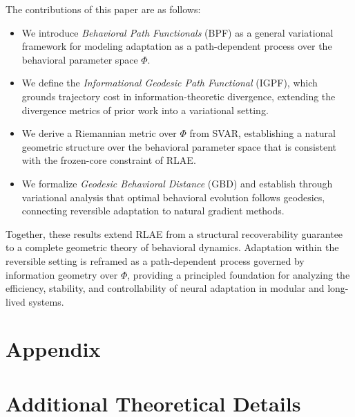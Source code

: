 \documentclass{article}
\begin{document}
The contributions of this paper are as follows:

\begin{itemize}
    \item We introduce \textit{Behavioral Path Functionals} (BPF) as a general variational
    framework for modeling adaptation as a path-dependent process over the behavioral
    parameter space $\Phi$.

    \item We define the \textit{Informational Geodesic Path Functional} (IGPF), which
    grounds trajectory cost in information-theoretic divergence, extending the divergence
    metrics of prior work into a variational setting.

    \item We derive a Riemannian metric over $\Phi$ from SVAR, establishing a natural
    geometric structure over the behavioral parameter space that is consistent with the
    frozen-core constraint of RLAE.

    \item We formalize \textit{Geodesic Behavioral Distance} (GBD) and establish through
    variational analysis that optimal behavioral evolution follows geodesics, connecting
    reversible adaptation to natural gradient methods.
\end{itemize}

Together, these results extend RLAE from a structural recoverability guarantee to a complete
geometric theory of behavioral dynamics. Adaptation within the reversible setting is
reframed as a path-dependent process governed by information geometry over $\Phi$, providing
a principled foundation for analyzing the efficiency, stability, and controllability of
neural adaptation in modular and long-lived systems.

\newpage




\newpage

\appendix

\section*{Appendix}

\section{Additional Theoretical Details}
\label{appendix:proofs}
\end{document}

